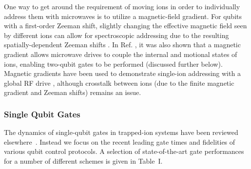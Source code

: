 \documentclass[%
reprint,
 amsmath,amssymb,
]{revtex4-1}
\begin{document}
One way to get around the requirement of moving ions in order to individually address them with microwaves is to utilize a magnetic-field gradient. For qubits with a first-order Zeeman shift, slightly changing the effective magnetic field seen by different ions can allow for spectroscopic addressing due to the resulting spatially-dependent Zeeman shifts \cite{MintertMicrowaveScheme2001}. In Ref. \cite{MintertMicrowaveScheme2001}, it was also shown that a magnetic gradient allows microwave drives to couple the internal and motional states of ions, enabling two-qubit gates to be performed (discussed further below). Magnetic gradients have been used to demonstrate single-ion addressing with a global RF drive \cite{JohanningRFAddress2009}, although crosstalk between ions (due to the finite magnetic gradient and Zeeman shifts) remains an issue.


    \subsubsection{Single Qubit Gates}
The dynamics of single-qubit gates in trapped-ion systems have been reviewed elsewhere~\cite{leibfried2003quantum}. Instead we focus on the recent leading gate times and fidelities of various qubit control protocols. A selection of state-of-the-art gate performances for a number of different schemes is given in Table~I.
\end{document}
